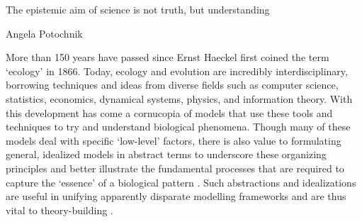 \epigraph{\justifying The epistemic aim of science is not truth, but understanding}{Angela Potochnik}

More than 150 years have passed since Ernst Haeckel first coined the term ‘ecology’ in 1866. Today, ecology and evolution are incredibly interdisciplinary, borrowing techniques and ideas from diverse fields such as computer science, statistics, economics, dynamical systems, physics, and information theory. With this development has come a cornucopia of models that use these tools and techniques to try and understand biological phenomena. Though many of these models deal with specific `low-level' factors, there is also value to formulating general, idealized models in abstract terms to underscore these organizing principles and better illustrate the fundamental processes that are required to capture the `essence' of a biological pattern \citep{frank_natural_2012, vellend_theory_2016}. Such abstractions and idealizations are useful in unifying apparently disparate modelling frameworks and are thus vital to theory-building \citep{luque_mirror_2021}.

